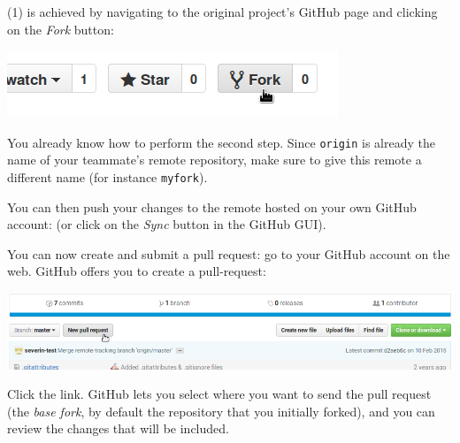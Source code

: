 \documentclass{instructions}
\begin{document}
(1) is achieved by navigating to the original project's GitHub page and
clicking on the \emph{Fork} button:

\begin{center}
    \includegraphics[width=0.35\linewidth]{figs/github-fork.png}
\end{center}


You already know how to perform the second step. Since \texttt{origin} is
already the name of your teammate's remote repository, make sure to give this
remote a different name (for instance \texttt{myfork}).



You can then push your changes to the remote hosted on your own GitHub account:
 (or click on the \emph{Sync} button in the GitHub GUI).

You can now create and submit a pull request: go to your GitHub account on the
web. GitHub offers you to create a pull-request:

\begin{center}
    \includegraphics[width=0.8\linewidth]{figs/github-pr1.png}
\end{center}

Click the link. GitHub lets you select where you want to send the pull request
(the \emph{base fork}, by default the repository that you initially forked), and
you can review the changes that will be included.
\end{document}
